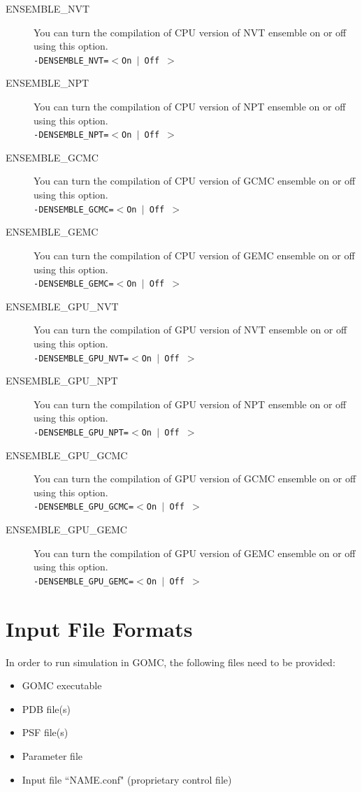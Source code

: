 \begin{description}
\item [ENSEMBLE\_NVT] You can turn the compilation of CPU version of NVT ensemble on or off using this option.\\
\texttt{-DENSEMBLE\_NVT=$<$On $\mid$ Off $>$}
\item [ENSEMBLE\_NPT] You can turn the compilation of CPU version of NPT ensemble on or off using this option.\\
\texttt{-DENSEMBLE\_NPT=$<$On $\mid$ Off $>$}
\item [ENSEMBLE\_GCMC] You can turn the compilation of CPU version of GCMC ensemble on or off using this option.\\
\texttt{-DENSEMBLE\_GCMC=$<$On $\mid$ Off $>$}
\item [ENSEMBLE\_GEMC] You can turn the compilation of CPU version of GEMC ensemble on or off using this option.\\
\texttt{-DENSEMBLE\_GEMC=$<$On $\mid$ Off $>$}
\item [ENSEMBLE\_GPU\_NVT] You can turn the compilation of GPU version of NVT ensemble on or off using this option.\\
\texttt{-DENSEMBLE\_GPU\_NVT=$<$On $\mid$ Off $>$}
\item [ENSEMBLE\_GPU\_NPT] You can turn the compilation of GPU version of NPT ensemble on or off using this option.\\
\texttt{-DENSEMBLE\_GPU\_NPT=$<$On $\mid$ Off $>$}
\item [ENSEMBLE\_GPU\_GCMC] You can turn the compilation of GPU version of GCMC ensemble on or off using this option.\\
\texttt{-DENSEMBLE\_GPU\_GCMC=$<$On $\mid$ Off $>$}
\item [ENSEMBLE\_GPU\_GEMC] You can turn the compilation of GPU version of GEMC ensemble on or off using this option.\\
\texttt{-DENSEMBLE\_GPU\_GEMC=$<$On $\mid$ Off $>$}
\end{description}

\newpage

\section{Input File Formats}
In order to run simulation in GOMC, the following files need to be provided:
\begin{itemize}
\item GOMC executable
\item PDB file(s)
\item PSF file(s)
\item Parameter file
\item Input file ``NAME.conf" (proprietary control file)\\\\
\end{itemize}

